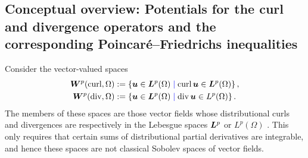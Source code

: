 \documentclass[10pt,a4paper]{article}
\newcommand\cye[1]{%
\protect\leavevmode
\begingroup
    \color{blue}%
    #1%
\endgroup
}
\begin{document}
\subsection{Conceptual overview: Potentials for the curl and divergence operators and the corresponding Poincar\'e--Friedrichs inequalities} \label{section:intro_curl_div}

Consider the vector-valued spaces
\begin{align}\label{equation:W_curl_div_p} 
    \bfW^{p}(\curl,\Omega) &:= \left\{ \bfu \in \bfL^{p}(\Omega) \cye{\suchthat} \curl \bfu \in \bfL^{p}(\Omega) \right\}
    ,
    \\
    \bfW^{p}(\divergence,\Omega) &:= \left\{ \bfu \in \bfL^{p}(\Omega) \cye{\suchthat} \divergence \bfu \in L^{p}(\Omega) \right\}
    .
\end{align}
The members of these spaces are those vector fields whose distributional curls and divergences are \cye{respectively} in \cye{the} Lebesgue spaces \cye{$\bm{L}^{p}$ or $L^{p}(\Omega)$}.  
This only requires that certain sums of distributional partial derivatives are integrable, 
and hence these spaces are not classical Sobolev spaces of vector  fields. 
\end{document}
